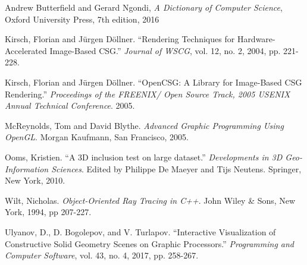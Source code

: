 \documentclass[12pt]{article}
\begin{document}
\newpage
\begin{thebibliography}{10}
  Andrew Butterfield and Gerard Ngondi,
  \textit{A Dictionary of Computer Science},
  Oxford University Press,
  7th edition,
  2016

  Kirsch, Florian and J\"{u}rgen D\"{o}llner. ``Rendering Techniques for Hardware-Accelerated Image-Based CSG.'' {\it Journal of WSCG}, vol. 12, no. 2, 2004, pp. 221-228.

  Kirsch, Florian and J\"{u}rgen D\"{o}llner. ``OpenCSG: A Library for Image-Based CSG Rendering.'' {\it Proceedings of the FREENIX/ Open Source Track, 2005 USENIX Annual Technical Conference}. 2005.

  McReynolds, Tom and David Blythe. {\it Advanced Graphic Programming Using OpenGL}. Morgan Kaufmann, San Francisco, 2005.

  Ooms, Kristien. ``A 3D inclusion test on large dataset.'' {\it Developments in 3D Geo-Information Sciences}. Edited by Philippe De Maeyer and Tijs Neutens. Springer, New York, 2010.

  Wilt, Nicholas. {\it Object-Oriented Ray Tracing in C++}. John Wiley \& Sons, New York, 1994, pp 207-227.

  Ulyanov, D., D. Bogolepov, and V. Turlapov. ``Interactive Visualization of Constructive Solid Geometry Scenes on Graphic Processors.'' {\it Programming and Computer Software}, vol. 43, no. 4, 2017, pp. 258-267.
\end{thebibliography}
\end{document}
